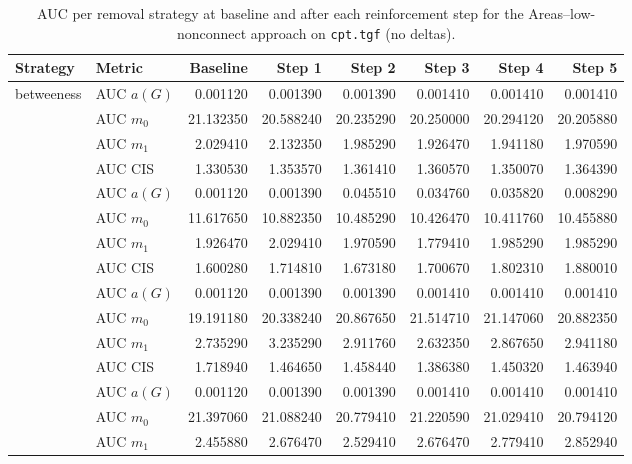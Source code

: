 \begin{table}[htbp]
  \centering
  \caption{AUC per removal strategy at baseline and after each reinforcement step for the Areas–low-nonconnect approach on \texttt{cpt.tgf} (no deltas).}
  \label{tab:cpt-areas_low_nonconnect-auc}
  \begin{tabular}{llrrrrrr}
    \toprule
    \textbf{Strategy} & \textbf{Metric} & \textbf{Baseline} & \textbf{Step 1} & \textbf{Step 2} & \textbf{Step 3} & \textbf{Step 4} & \textbf{Step 5} \\
    \midrule
    \multirow{4}{*}{betweeness} & AUC $a(G)$ & 0.001120 & 0.001390 & 0.001390 & 0.001410 & 0.001410 & 0.001410 \\
    & AUC $m_0$ & 21.132350 & 20.588240 & 20.235290 & 20.250000 & 20.294120 & 20.205880 \\
    & AUC $m_1$ & 2.029410 & 2.132350 & 1.985290 & 1.926470 & 1.941180 & 1.970590 \\
    & AUC CIS & 1.330530 & 1.353570 & 1.361410 & 1.360570 & 1.350070 & 1.364390 \\
    \addlinespace
    \multirow{4}{*}{closeness} & AUC $a(G)$ & 0.001120 & 0.001390 & 0.045510 & 0.034760 & 0.035820 & 0.008290 \\
    & AUC $m_0$ & 11.617650 & 10.882350 & 10.485290 & 10.426470 & 10.411760 & 10.455880 \\
    & AUC $m_1$ & 1.926470 & 2.029410 & 1.970590 & 1.779410 & 1.985290 & 1.985290 \\
    & AUC CIS & 1.600280 & 1.714810 & 1.673180 & 1.700670 & 1.802310 & 1.880010 \\
    \addlinespace
    \multirow{4}{*}{core influence} & AUC $a(G)$ & 0.001120 & 0.001390 & 0.001390 & 0.001410 & 0.001410 & 0.001410 \\
    & AUC $m_0$ & 19.191180 & 20.338240 & 20.867650 & 21.514710 & 21.147060 & 20.882350 \\
    & AUC $m_1$ & 2.735290 & 3.235290 & 2.911760 & 2.632350 & 2.867650 & 2.941180 \\
    & AUC CIS & 1.718940 & 1.464650 & 1.458440 & 1.386380 & 1.450320 & 1.463940 \\
    \addlinespace
    \multirow{4}{*}{degree} & AUC $a(G)$ & 0.001120 & 0.001390 & 0.001390 & 0.001410 & 0.001410 & 0.001410 \\
    & AUC $m_0$ & 21.397060 & 21.088240 & 20.779410 & 21.220590 & 21.029410 & 20.794120 \\
    & AUC $m_1$ & 2.455880 & 2.676470 & 2.529410 & 2.676470 & 2.779410 & 2.852940 \\

\end{tabular}
\end{table}
